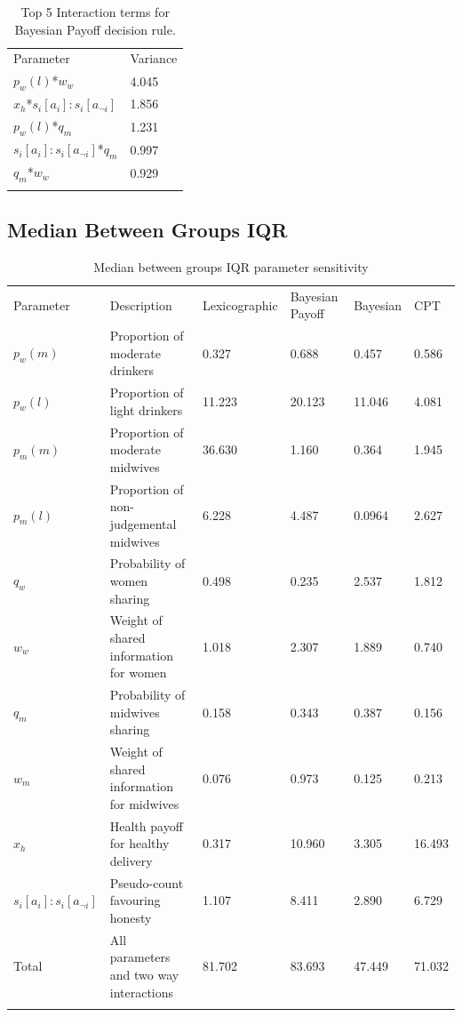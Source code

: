 \documentclass[graybox]{svmult}
\begin{document}
\begin{table}[H]
\caption{Top 5 Interaction terms for Bayesian Payoff decision rule. \label{tab:sa_interaction_payoff_sig}}
\begin{tabular} {ll}
\hline\noalign{\smallskip}
Parameter & Variance \\
\noalign{\smallskip}\svhline\noalign{\smallskip}
\(p_{w}(l)\)*\(w_{w}\) & 4.045\\
\(x_{h}\)*\(s_{i}[a_{i}]:s_{i}[a_{\neg i}]\) & 1.856\\
\(p_{w}(l)\)*\(q_{m}\) & 1.231\\
\(s_{i}[a_{i}]:s_{i}[a_{\neg i}]\)*\(q_{m}\) & 0.997\\
\(q_{m}\)*\(w_{w}\) & 0.929\\ 
\noalign{\smallskip}\hline\noalign{\smallskip}
\end{tabular}
\end{table}

 
\subsection{Median Between Groups IQR}

\begin{table}[H]
\caption{Median between groups IQR parameter sensitivity \label{tab:sa_results_iqr}}
\begin{tabular} {llllll}
\hline\noalign{\smallskip}
Parameter & Description & Lexicographic & Bayesian Payoff & Bayesian & \ac{CPT} \\
\noalign{\smallskip}\svhline\noalign{\smallskip}
\(p_{w}(m)\) & Proportion of moderate drinkers & 0.327 & 0.688 & 0.457 & 0.586 \\
\(p_{w}(l)\) & Proportion of light drinkers & 11.223 & 20.123 & 11.046 & 4.081 \\
\(p_{m}(m)\) & Proportion of moderate midwives & 36.630 & 1.160 & 0.364 & 1.945 \\
\(p_{m}(l)\) & Proportion of non-judgemental midwives & 6.228 & 4.487 & 0.0964 & 2.627\\
\(q_{w}\) & Probability of women sharing & 0.498 & 0.235 & 2.537 & 1.812 \\
\(w_{w}\) & Weight of shared information for women & 1.018 & 2.307 & 1.889 & 0.740 \\
\(q_{m}\) & Probability of midwives sharing & 0.158 & 0.343 & 0.387 & 0.156 \\
\(w_{m}\) & Weight of shared information for midwives & 0.076 & 0.973 & 0.125 & 0.213 \\
\(x_{h}\) & Health payoff for healthy delivery & 0.317 & 10.960 & 3.305 & 16.493 \\
\(s_{i}[a_{i}]:s_{i}[a_{\neg i}]\) & Pseudo-count favouring honesty & 1.107 & 8.411 & 2.890 & 6.729 \\
Total & All parameters and two way interactions & 81.702 & 83.693 & 47.449 & 71.032 \\
\noalign{\smallskip}\hline\noalign{\smallskip}
\end{tabular}
\end{table}
\end{document}
